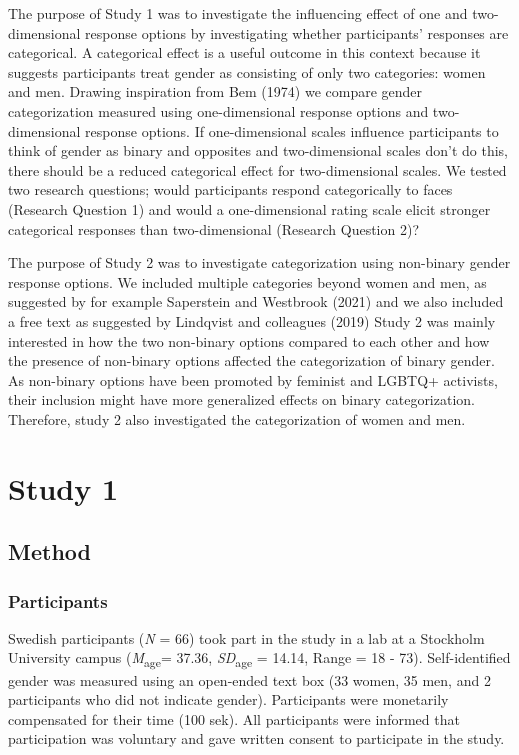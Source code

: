 \documentclass[
  man,
  longtable,
  nolmodern,
  notxfonts,
  notimes,
  colorlinks=true,linkcolor=blue,citecolor=blue,urlcolor=blue]{apa7}
\begin{document}
The purpose of Study 1 was to investigate the influencing effect of one
and two-dimensional response options by investigating whether
participants' responses are categorical. A categorical effect is a
useful outcome in this context because it suggests participants treat
gender as consisting of only two categories: women and men. Drawing
inspiration from Bem (1974) we compare gender categorization measured
using one-dimensional response options and two-dimensional response
options. If one-dimensional scales influence participants to think of
gender as binary and opposites and two-dimensional scales don't do this,
there should be a reduced categorical effect for two-dimensional scales.
We tested two research questions; would participants respond
categorically to faces (Research Question 1) and would a one-dimensional
rating scale elicit stronger categorical responses than two-dimensional
(Research Question 2)?

The purpose of Study 2 was to investigate categorization using
non-binary gender response options. We included multiple categories
beyond women and men, as suggested by for example Saperstein and
Westbrook (2021) and we also included a free text as suggested by
Lindqvist and colleagues (2019) Study 2 was mainly interested in how the
two non-binary options compared to each other and how the presence of
non-binary options affected the categorization of binary gender. As
non-binary options have been promoted by feminist and LGBTQ+ activists,
their inclusion might have more generalized effects on binary
categorization. Therefore, study 2 also investigated the categorization
of women and men.

\section{Study 1}\label{study-1}

\subsection{Method}\label{method}

\subsubsection{Participants}\label{participants}

Swedish participants (\emph{N} = 66) took part in the study in a lab at
a Stockholm University campus (\emph{M}\textsubscript{age}= 37.36,
\emph{SD}\textsubscript{age} = 14.14, Range = 18 - 73). Self-identified
gender was measured using an open-ended text box (33 women, 35 men, and
2 participants who did not indicate gender). Participants were
monetarily compensated for their time (100 sek). All participants were
informed that participation was voluntary and gave written consent to
participate in the study.
\end{document}
